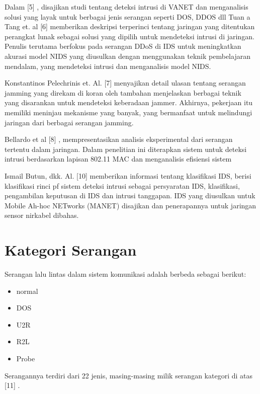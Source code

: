 \documentclass[conference]{IEEEtran}
\begin{document}
    Dalam [5] \cite {gonccalves2019systematic}, disajikan studi tentang deteksi intrusi di VANET dan menganalisis solusi yang layak untuk berbagai jenis serangan seperti DOS, DDOS dll Tuan a Tang et. al [6] \cite{tang2016deep} memberikan deskripsi terperinci tentang jaringan yang ditentukan perangkat lunak sebagai solusi yang dipilih untuk mendeteksi intrusi di jaringan. Penulis terutama berfokus pada serangan DDoS di IDS untuk meningkatkan akurasi model NIDS yang diusulkan dengan menggunakan teknik pembelajaran mendalam, yang mendeteksi intrusi dan menganalisis model NIDS.

    Konstantinos Pelechrinis et. Al. [7] \cite {pelechrinis2010denial} menyajikan detail ulasan tentang serangan jamming yang direkam di koran oleh tambahan menjelaskan berbagai teknik yang disarankan untuk mendeteksi keberadaan jammer. Akhirnya, pekerjaan itu memiliki meninjau mekanisme yang banyak, yang bermanfaat untuk melindungi jaringan dari berbagai serangan jamming.
    
    Bellardo et al [8] \cite {bellardo2003802}, mempresentasikan analisis eksperimental dari serangan tertentu dalam jaringan. Dalam penelitian ini diterapkan sistem untuk deteksi intrusi berdasarkan lapisan 802.11 MAC dan menganalisis efisiensi sistem
    
    Ismail Butun, dkk. Al. [10] \cite {zhang2000intrusion} memberikan informasi tentang klasifikasi IDS, berisi klasifikasi rinci pf sistem deteksi intrusi sebagai persyaratan IDS, klasifikasi, pengambilan keputusan di IDS dan intrusi tanggapan. IDS yang diusulkan untuk Mobile Ah-hoc NETworks (MANET) disajikan dan penerapannya untuk jaringan sensor nirkabel dibahas.
    
\section{Kategori Serangan}
Serangan lalu lintas dalam sistem komunikasi adalah
berbeda sebagai berikut:

\begin{itemize}
    \item normal
    \item DOS
    \item U2R
    \item R2L
    \item Probe
\end{itemize}

Serangannya terdiri dari 22 jenis, masing-masing milik serangan
kategori di atas [11] \cite {butun2013survey}.
\end{document}
